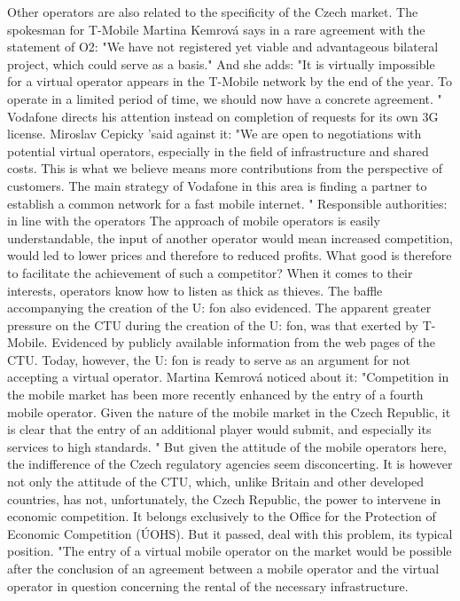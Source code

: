 Other operators are also related to the specificity of the Czech market.
The spokesman for T-Mobile Martina Kemrová says in a rare agreement with the statement of O2: "We have not registered yet viable and advantageous bilateral project, which could serve as a basis."
And she adds: "It is virtually impossible for a virtual operator appears in the T-Mobile network by the end of the year.
To operate in a limited period of time, we should now have a concrete agreement. "
Vodafone directs his attention instead on completion of requests for its own 3G license.
Miroslav Cepicky 'said against it: "We are open to negotiations with potential virtual operators, especially in the field of infrastructure and shared costs.
This is what we believe means more contributions from the perspective of customers.
The main strategy of Vodafone in this area is finding a partner to establish a common network for a fast mobile internet. "
Responsible authorities: in line with the operators
The approach of mobile operators is easily understandable, the input of another operator would mean increased competition, would led to lower prices and therefore to reduced profits.
What good is therefore to facilitate the achievement of such a competitor?
When it comes to their interests, operators know how to listen as thick as thieves. The baffle accompanying the creation of the U: fon also evidenced.
The apparent greater pressure on the CTU during the creation of the U: fon, was that exerted by T-Mobile.
Evidenced by publicly available information from the web pages of the CTU.
Today, however, the U: fon is ready to serve as an argument for not accepting a virtual operator.
Martina Kemrová noticed about it: "Competition in the mobile market has been more recently enhanced by the entry of a fourth mobile operator.
Given the nature of the mobile market in the Czech Republic, it is clear that the entry of an additional player would submit, and especially its services to high standards. "
But given the attitude of the mobile operators here, the indifference of the Czech regulatory agencies seem disconcerting.
It is however not only the attitude of the CTU, which, unlike Britain and other developed countries, has not, unfortunately, the Czech Republic, the power to intervene in economic competition.
It belongs exclusively to the Office for the Protection of Economic Competition (ÚOHS).
But it passed, deal with this problem, its typical position.
"The entry of a virtual mobile operator on the market would be possible after the conclusion of an agreement between a mobile operator and the virtual operator in question concerning the rental of the necessary infrastructure.
